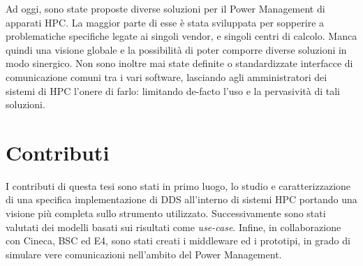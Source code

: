 Ad oggi, sono state proposte diverse soluzioni per il Power Management di apparati HPC. La maggior parte di esse è stata sviluppata per sopperire a problematiche specifiche legate ai singoli vendor, e singoli centri di calcolo. Manca quindi una visione globale e la possibilità di poter comporre diverse soluzioni in modo sinergico.
Non sono inoltre mai state definite o standardizzate interfacce di comunicazione comuni tra i vari software, lasciando agli amministratori dei sistemi di HPC l'onere di farlo: limitando de-facto l'uso e la pervasività di tali soluzioni.





\section{Contributi}
I contributi di questa tesi sono stati in primo luogo, lo studio e caratterizzazione di una specifica implementazione di DDS all'interno di sistemi HPC portando una visione più completa sullo strumento utilizzato. Successivamente sono stati valutati dei modelli basati sui risultati come \emph{use-case}. Infine, in collaborazione con Cineca\cite{Cineca}, BSC\cite{BSC} ed E4\cite{E4}, sono stati creati i middleware ed i prototipi, in grado di simulare vere comunicazioni nell'ambito del Power Management.